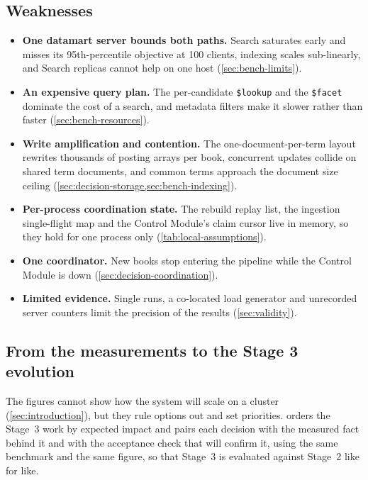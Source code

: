\documentclass[10pt,a4paper]{article}
\newcommand{\code}[1]{\texttt{#1}}
\begin{document}
\subsection{Weaknesses}
\label{sec:weaknesses}

\begin{itemize}
  \item \textbf{One datamart server bounds both paths.} Search saturates early
  and misses its 95th-percentile objective at 100 clients, indexing scales
  sub-linearly, and Search replicas cannot help on one host
  (\cref{sec:bench-limits}).
  \item \textbf{An expensive query plan.} The per-candidate \code{\$lookup} and
  the \code{\$facet} dominate the cost of a search, and metadata filters make it
  slower rather than faster (\cref{sec:bench-resources}).
  \item \textbf{Write amplification and contention.} The one-document-per-term
  layout rewrites thousands of posting arrays per book, concurrent updates
  collide on shared term documents, and common terms approach the document
  size ceiling (\cref{sec:decision-storage,sec:bench-indexing}).
  \item \textbf{Per-process coordination state.} The rebuild replay list, the
  ingestion single-flight map and the Control Module's claim cursor live in
  memory, so they hold for one process only (\cref{tab:local-assumptions}).
  \item \textbf{One coordinator.} New books stop entering the pipeline while
  the Control Module is down (\cref{sec:decision-coordination}).
  \item \textbf{Limited evidence.} Single runs, a co-located load generator and
  unrecorded server counters limit the precision of the results
  (\cref{sec:validity}).
\end{itemize}

\subsection{From the measurements to the Stage 3 evolution}
\label{sec:evidence-to-design}
\label{sec:stage3}

The figures cannot show how the system will scale on a cluster
(\cref{sec:introduction}), but they rule options out and set priorities.
 orders the Stage~3 work by expected impact and pairs
each decision with the measured fact behind it and with the acceptance check
that will confirm it, using the same benchmark and the same figure, so that
Stage~3 is evaluated against Stage~2 like for like.
\end{document}
